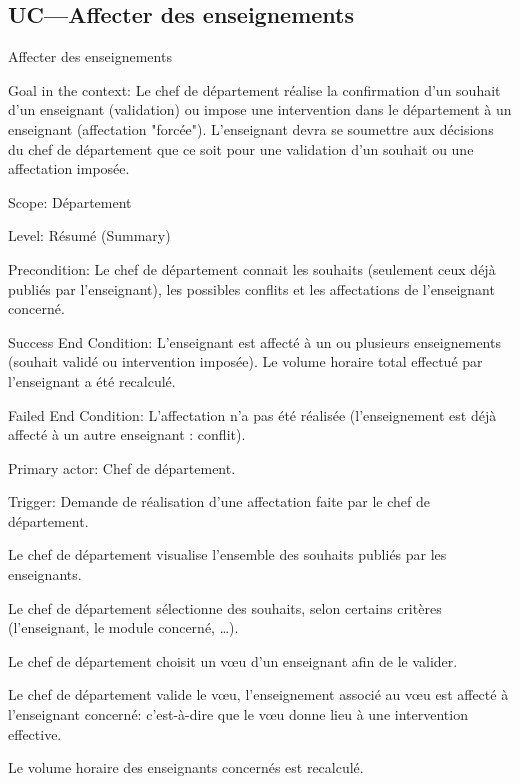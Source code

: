 \subsection{UC---Affecter des enseignements}

\begin{usecase}{Affecter des enseignements}\label{usecase:affecter}
\begin{information}

 \item[Goal in the context:] Le chef de département réalise la confirmation d'un souhait d'un enseignant (validation) ou impose une intervention dans le département à un enseignant (affectation "forcée"). 
 L'enseignant devra se soumettre aux décisions du chef de département que ce soit pour une validation d'un souhait ou une affectation imposée.

\item[Scope:] Département

\item[{Level:}] Résumé (Summary)

 \item[{Precondition:}]
Le chef de département connait les souhaits (seulement ceux déjà publiés par l'enseignant), les possibles conflits et les affectations de l'enseignant concerné.

 \item[{Success End Condition:}]
L'enseignant est affecté à un ou plusieurs enseignements (souhait validé ou intervention imposée). 
Le volume horaire total effectué par l'enseignant a été recalculé.

 \item[{Failed End Condition:}]
 L'affectation n'a pas été réalisée (l'enseignement est déjà affecté à un autre enseignant : conflit).

\item[Primary actor:]
Chef de département.

 \item[Trigger:] Demande de réalisation d'une affectation faite par le chef de département.
\end{information}

\begin{scenario}
\item Le chef de département visualise l'ensemble des souhaits publiés par les enseignants.
\item Le chef de département sélectionne des souhaits, selon certains critères (l'enseignant, le module concerné, \dots).
\item Le chef de département choisit un vœu d'un enseignant afin de le valider.
\item Le chef de département valide le vœu, l'enseignement associé au vœu est affecté à l'enseignant concerné: c'est-à-dire que le vœu donne lieu à une intervention effective.
\item Le volume horaire des enseignants concernés est recalculé. 
\end{scenario}


\end{usecase}
